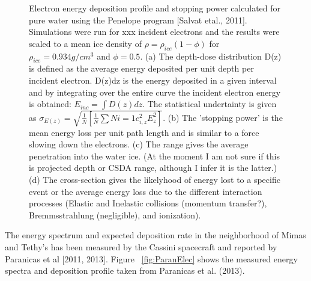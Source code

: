 \documentclass[11pt]{article} %
\begin{document}
\begin{figure}[ht]
	\caption{Electron energy deposition profile and stopping power calculated for pure water using the Penelope program [Salvat etal., 2011]. Simulations were run for xxx incident electrons and the results were scaled to a mean ice density of $\rho = \rho_{ice}(1-\phi)$ for $\rho_{ice} = 0.934 g/cm^{3}$ and $\phi=0.5$. (a) The depth-dose distribution D(z) is defined as the average energy deposited per unit depth per incident electron. D(z)dz is the energy deposited in a given interval and by integrating over the entire curve the incident electron energy is obtained: $E_{inc} = \int{D(z)dz}$. The statistical undertainty is given as $\sigma_{E(z)} = \sqrt{\frac{1}{N}\left[{\frac{1}{N}\sum{N}{i=1}c^{2}_{i,z}E^{2}_{z}}\right]}$. (b) The 'stopping power' is the mean energy loss per unit path length and is similar to a force slowing down the electrons. (c) The range gives the average penetration into the water ice. (At the moment I am not sure if this is projected depth or CSDA range, although I infer it is the latter.) (d) The cross-section gives the likelyhood of energy lost to a specific event or the average energy loss due to the different interaction processes (Elastic and Inelastic collisions (momentum transfer?), Bremmsstrahlung (negligible), and ionization).}
	\end{figure}
	
	The energy spectrum and expected deposition rate in the neighborhood of Mimas and Tethy's has been measured by the Cassini spacecraft and reported by Paranicas et al [2011, 2013]. Figure ~\ref{fig:ParanElec} shows the measured energy spectra and deposition profile taken from Paranicas et al. (2013).
	
\end{document}
